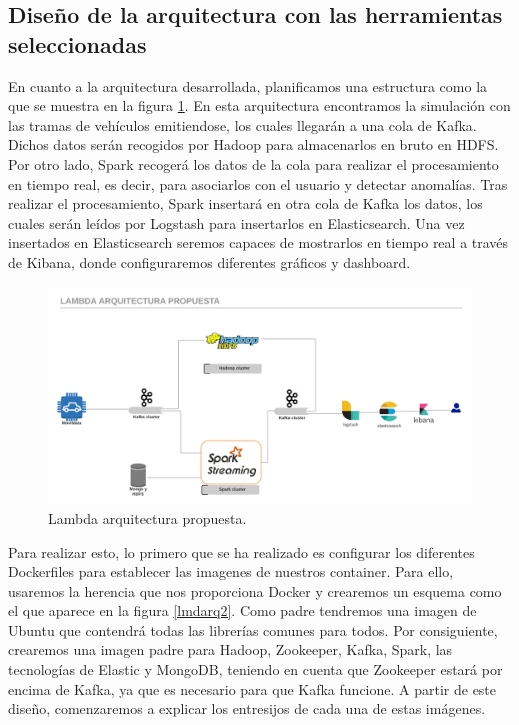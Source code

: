 \subsection{Diseño de la arquitectura con las herramientas seleccionadas\label{disenio}}

En cuanto a la arquitectura desarrollada, planificamos una estructura como la que se muestra en la figura \ref{lmdarq1}. En esta arquitectura encontramos la simulación con las tramas de vehículos emitiendose, los cuales llegarán a una cola de Kafka. Dichos datos serán recogidos por Hadoop para almacenarlos en bruto en HDFS. Por otro lado, Spark recogerá los datos de la cola para realizar el procesamiento en tiempo real, es decir, para asociarlos con el usuario y detectar anomalías. Tras realizar el procesamiento, Spark insertará en otra cola de Kafka los datos, los cuales serán leídos por Logstash para insertarlos en Elasticsearch. Una vez insertados en Elasticsearch seremos capaces de mostrarlos en tiempo real a través de Kibana, donde configuraremos diferentes gráficos y dashboard.

\begin{figure}[htp]
\centering
\includegraphics[scale=0.26]{Imagenes/arqProp1.png}
\caption{Lambda arquitectura propuesta.}
\label{lmdarq1}
\end{figure}

Para realizar esto, lo primero que se ha realizado es configurar los diferentes Dockerfiles para establecer las imagenes de nuestros container. Para ello, usaremos la herencia que nos proporciona Docker y crearemos un esquema como el que aparece en la figura \ref{lmdarq2}. Como padre tendremos una imagen de Ubuntu que contendrá todas las librerías comunes para todos. Por consiguiente, crearemos una imagen padre para Hadoop, Zookeeper, Kafka, Spark, las tecnologías de Elastic y MongoDB, teniendo en cuenta que Zookeeper estará por encima de Kafka, ya que es necesario para que Kafka funcione. A partir de este diseño, comenzaremos a explicar los entresijos de cada una de estas imágenes.


